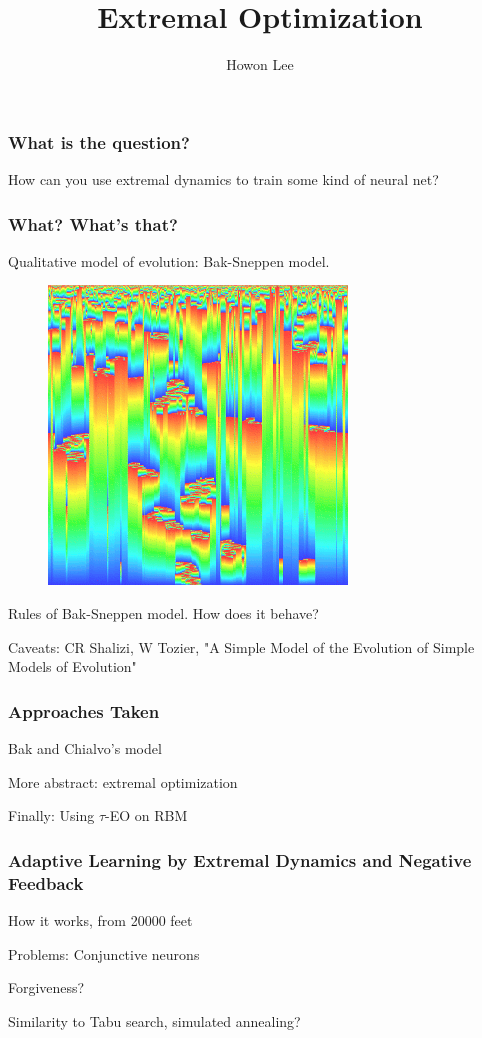 \documentclass{beamer}
\begin{document}
\title{Extremal Optimization}
\author{Howon Lee}
\maketitle

\begin{frame}
  \frametitle{What is the question?}
  How can you use extremal dynamics to train some kind of neural net?
\end{frame}

\begin{frame}
  \frametitle{What? What's that?}
  Qualitative model of evolution: Bak-Sneppen model.
  \begin{figure}
    \includegraphics{bak_sneppen}
  \end{figure}

  Rules of Bak-Sneppen model. How does it behave?

  Caveats: CR Shalizi, W Tozier, "A Simple Model of the Evolution of Simple Models of Evolution"
\end{frame}

\begin{frame}
  \frametitle{Approaches Taken}
  Bak and Chialvo's model

  More abstract: extremal optimization

  Finally: Using $\tau$-EO on RBM
\end{frame}

\begin{frame}
  \frametitle{Adaptive Learning by Extremal Dynamics and Negative Feedback}
  How it works, from 20000 feet

  Problems: Conjunctive neurons %

  Forgiveness?

  Similarity to Tabu search, simulated annealing?
\end{frame}
\end{document}
